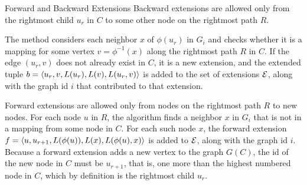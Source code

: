 \begin{frame}{Forward and Backward Extensions}
  \small
Backward extensions are
allowed only from the rightmost
child $u_r$ in $C$ to some other node on the rightmost path $R$.

\medskip The method considers each neighbor $x$ of $\phi(u_r)$ in $G_i$
and checks whether it is a mapping for some vertex $v = \phi^{-1}(x)$
along the rightmost path $R$ in $C$. If the edge $(u_r,v)$ does not
already exist in $C$, it is a new extension, and the extended tuple $b =
\langle u_r, v, L(u_r), L(v), L(u_r,v) \rangle$ is added to the set of extensions
${\mathcal E}$, along with the graph id $i$ that contributed to that extension.

\bigskip Forward extensions are allowed only from nodes on the rightmost
path $R$ to new nodes.  For each node $u$ in $R$, the algorithm
f\/{i}nds a neighbor $x$ in $G_i$ that is not in a mapping from some
node in $C$. For each such node $x$, the forward extension $f=\langle u,
u_{r+1}, L(\phi(u)), L(x), L(\phi(u),x) \rangle$ is added to ${\mathcal E}$, along with
the graph id $i$.  Because a forward extension adds a new vertex to the
	graph $G(C)$, the id of the new node in $C$ must be $u_{r+1}$, that is,
one more than the highest numbered node in $C$, which by def\/{i}nition
is the rightmost child $u_r$.

\end{frame}


